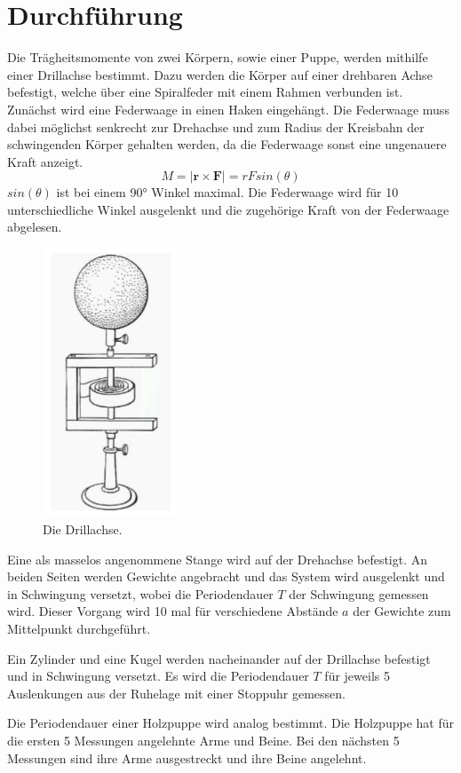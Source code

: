 \section{Durchführung}
\label{sec:Durchführung}
Die Trägheitsmomente von zwei Körpern, sowie einer Puppe, werden mithilfe
einer Drillachse bestimmt. Dazu werden die Körper auf einer drehbaren Achse befestigt,
welche über eine Spiralfeder mit einem Rahmen verbunden ist. Zunächst wird eine Federwaage
in einen Haken eingehängt. Die Federwaage muss dabei möglichst senkrecht zur Drehachse
und zum Radius der Kreisbahn der schwingenden Körper gehalten werden, da
die Federwaage sonst eine ungenauere Kraft anzeigt.
\begin{equation}
  M = |\symbf{r} \times \symbf{F}| = r F sin(\theta)
\end{equation}
$sin(\theta)$ ist bei einem 90° Winkel maximal. Die Federwaage wird für 10 unterschiedliche
Winkel ausgelenkt und die zugehörige Kraft von der Federwaage abgelesen.

\begin{figure}[H]
  \centering
  \includegraphics[height=8cm]{Drillachse.PNG}
  \caption{Die Drillachse.}
  \label{fig:drill}
\end{figure}

Eine als masselos angenommene Stange wird auf der Drehachse befestigt. An beiden
Seiten werden Gewichte angebracht und das System wird ausgelenkt und in Schwingung
versetzt, wobei die Periodendauer $T$ der Schwingung gemessen wird. Dieser Vorgang
wird 10 mal für verschiedene Abstände $a$ der Gewichte zum Mittelpunkt durchgeführt.

Ein Zylinder und eine Kugel werden nacheinander auf der Drillachse befestigt und
in Schwingung versetzt. Es wird die Periodendauer $T$ für jeweils 5 Auslenkungen
aus der Ruhelage mit einer Stoppuhr gemessen.

Die Periodendauer einer Holzpuppe wird analog bestimmt. Die Holzpuppe
hat für die ersten 5 Messungen angelehnte Arme und Beine. Bei den nächsten 5
Messungen sind ihre Arme ausgestreckt und ihre Beine angelehnt.

